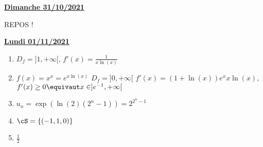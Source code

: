 \documentclass[a4paper, 11pt,reqno]{article}
\newcommand{\jour}[1]{
\begin{center}
\underline{\textbf{#1}}
\end{center}

 }
\begin{document}
\jour{Dimanche 31/10/2021}
REPOS ! 

\jour{Lundi 01/11/2021}
\begin{correction}
\begin{enumerate}
\item $D_f= ]1,+\infty[$, $f'(x) = \frac{1}{x\ln(x)}$
\item $f(x) =x^x=e^{x\ln(x)}$ $D_f=]0,+\infty[$ 
$f'(x) = (1+\ln(x))e^x{x\ln(x)}$, $f'(x) \geq 0 \equivaut x\in ]e^{-1}, +\infty[$

\item $u_n =\exp(\ln(2) (2^n-1)) = 2^{2^n-1}$
\item $\cS =\{ (-1,1,0)\}$
\item $\frac{1}{2}$
\end{enumerate}
\end{correction} 
\end{document}

